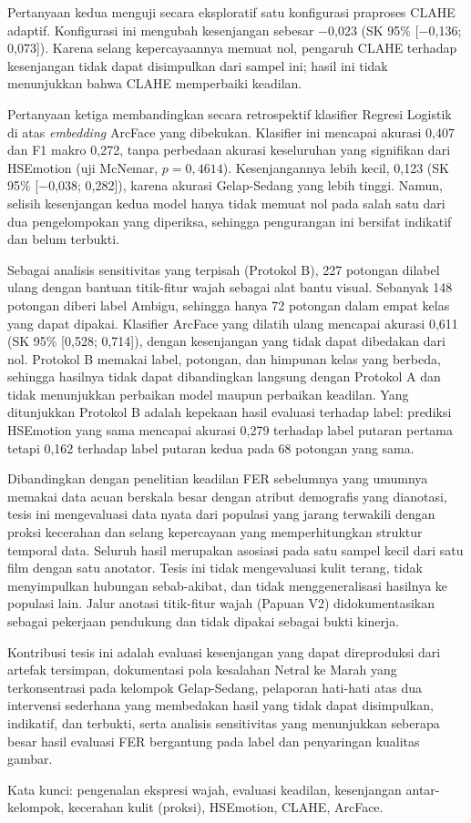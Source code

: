 Pertanyaan kedua menguji secara eksploratif satu konfigurasi praproses CLAHE\label{abbr:CLAHE} adaptif. Konfigurasi ini mengubah kesenjangan sebesar $-$0,023 (SK 95\% [$-$0,136; 0,073]). Karena selang kepercayaannya memuat nol, pengaruh CLAHE terhadap kesenjangan tidak dapat disimpulkan dari sampel ini; hasil ini tidak menunjukkan bahwa CLAHE memperbaiki keadilan.

Pertanyaan ketiga membandingkan secara retrospektif klasifier Regresi Logistik di atas \textit{embedding} ArcFace yang dibekukan. Klasifier ini mencapai akurasi 0,407 dan F1 makro 0,272, tanpa perbedaan akurasi keseluruhan yang signifikan dari HSEmotion (uji McNemar, $p = 0{,}4614$). Kesenjangannya lebih kecil, 0,123 (SK 95\% [$-$0,038; 0,282]), karena akurasi Gelap-Sedang yang lebih tinggi. Namun, selisih kesenjangan kedua model hanya tidak memuat nol pada salah satu dari dua pengelompokan yang diperiksa, sehingga pengurangan ini bersifat indikatif dan belum terbukti.

Sebagai analisis sensitivitas yang terpisah (Protokol B), 227 potongan dilabel ulang dengan bantuan titik-fitur wajah sebagai alat bantu visual. Sebanyak 148 potongan diberi label Ambigu, sehingga hanya 72 potongan dalam empat kelas yang dapat dipakai. Klasifier ArcFace yang dilatih ulang mencapai akurasi 0,611 (SK 95\% [0,528; 0,714]), dengan kesenjangan yang tidak dapat dibedakan dari nol. Protokol B memakai label, potongan, dan himpunan kelas yang berbeda, sehingga hasilnya tidak dapat dibandingkan langsung dengan Protokol A dan tidak menunjukkan perbaikan model maupun perbaikan keadilan. Yang ditunjukkan Protokol B adalah kepekaan hasil evaluasi terhadap label: prediksi HSEmotion yang sama mencapai akurasi 0,279 terhadap label putaran pertama tetapi 0,162 terhadap label putaran kedua pada 68 potongan yang sama.

Dibandingkan dengan penelitian keadilan FER sebelumnya yang umumnya memakai data acuan berskala besar dengan atribut demografis yang dianotasi, tesis ini mengevaluasi data nyata dari populasi yang jarang terwakili dengan proksi kecerahan dan selang kepercayaan yang memperhitungkan struktur temporal data. Seluruh hasil merupakan asosiasi pada satu sampel kecil dari satu film dengan satu anotator. Tesis ini tidak mengevaluasi kulit terang, tidak menyimpulkan hubungan sebab-akibat, dan tidak menggeneralisasi hasilnya ke populasi lain. Jalur anotasi titik-fitur wajah (Papuan V2) didokumentasikan sebagai pekerjaan pendukung dan tidak dipakai sebagai bukti kinerja.

Kontribusi tesis ini adalah evaluasi kesenjangan yang dapat direproduksi dari artefak tersimpan, dokumentasi pola kesalahan Netral ke Marah yang terkonsentrasi pada kelompok Gelap-Sedang, pelaporan hati-hati atas dua intervensi sederhana yang membedakan hasil yang tidak dapat disimpulkan, indikatif, dan terbukti, serta analisis sensitivitas yang menunjukkan seberapa besar hasil evaluasi FER bergantung pada label dan penyaringan kualitas gambar.

\vspace{2\baselineskip}
Kata kunci: pengenalan ekspresi wajah, evaluasi keadilan, kesenjangan antar-kelompok, kecerahan kulit (proksi), HSEmotion, CLAHE, ArcFace.
